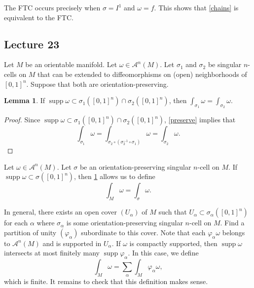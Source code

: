 \documentclass[10pt,letterpaper,cm]{nupset}
\theoremstyle{definition}
\theoremstyle{theorem}
\newtheorem{lemma}[definition]{Lemma}
\theoremstyle{remark}
\newcommand{\1}{\mathbf{1}}
\newcommand{\0}{\vec 0}
\DeclareMathOperator{\supp}{supp}
\begin{document}
\smallskip

The FTC occurs precisely when $\sigma = I^1$ and $\omega = f$. This shows that \cref{chains} is equivalent to the FTC.



\subsection{Lecture 23}

Let $M$ be an orientable manifold. Let $\omega \in \mathcal{A}^n(M)$. Let $\sigma_1$ and $\sigma_2$ be singular $n$-cells on $M$ that can be extended to diffeomorphisms on (open) neighborhoods of $\left[0,1\right]^n$. Suppose that both are orientation-preserving. 

\begin{lemma}\label{orient}
If $\supp \omega \subset  \sigma_1(\left[0,1\right]^n) \cap \sigma_2(\left[0,1\right]^n)$, then $\int_{\sigma_1} \omega = \int_{\sigma_2} \omega$.
\end{lemma}
\begin{proof}
Since $\supp \omega \subset  \sigma_1(\left[0,1\right]^n) \cap \sigma_2(\left[0,1\right]^n)$, \cref{preserve} implies that 
\[
\int_{\sigma_1} \omega = \int_{\sigma_2 \circ (\sigma_2^{-1} \circ \sigma_1)} \omega  = \int_{\sigma_2} \omega     .
\]
\end{proof}

\medskip

 Let $\omega \in \mathcal{A}^n(M)$. Let $\sigma$ be an orientation-preserving singular $n$-cell on $M$. If $\supp \omega \subset \sigma(\left[0,1\right]^n)$, then \cref{orient} allows us to define $$\int_M \omega = \int_{\sigma} \omega.$$

\smallskip


 In general, there exists an open cover $\left(U_{\alpha}\right)$ of $M$ such that $U_{\alpha} \subset \sigma_{\alpha}(\left[0,1\right]^n)$ for each $\alpha$ where $\sigma_{\alpha}$ is some orientation-preserving singular $n$-cell on $M$. Find a partition of unity $\left(\varphi_{\alpha}\right)$ subordinate to this cover. Note that each $\varphi_{\alpha} \omega$ belongs to  $\mathcal{A}^n(M)$ and is supported in $U_{\alpha}$. If $\omega$ is compactly supported, then $\supp \omega$ intersects at most finitely many $\supp \varphi_{\alpha}$. In this case, we define $$\int_M \omega = \sum_{\alpha}  \int_M \varphi_{\alpha} \omega,$$ which is finite. 
It remains to check that this definition makes sense.
\end{document}
